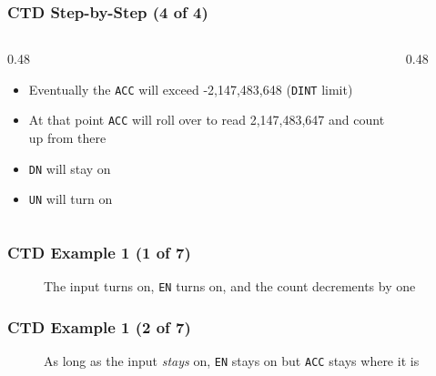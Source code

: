 \begin{frame}
    \frametitle{CTD Step-by-Step (4 of 4)}

    \begin{columns}
        \begin{column}{0.48\linewidth}
            \begin{itemize}
                \item Eventually the \texttt{ACC} will exceed -2,147,483,648 (\texttt{DINT} limit)
                \item At that point \texttt{ACC} will roll over to read 2,147,483,647 and count up from there
                \item \texttt{DN} will stay on
                \item \texttt{UN} will turn on
            \end{itemize}
        \end{column}
        \begin{column}{0.48\linewidth}
            \begin{figure}
                \centering
                \resizebox{\columnwidth}{!}{
                    
                }
            \end{figure}
        \end{column}
    \end{columns}
\end{frame}

\begin{frame}
    \frametitle{CTD Example 1 (1 of 7)}

    \begin{figure}
        \centering
        \resizebox{0.875\linewidth}{!}{
            
        }

        \vspace{0.5em}
        {\footnotesize The input turns on, \texttt{EN} turns on, and the count decrements by one\par}
    \end{figure}
\end{frame}

\begin{frame}
    \frametitle{CTD Example 1 (2 of 7)}

    \begin{figure}
        \centering
        \resizebox{0.875\linewidth}{!}{
            
        }

        \vspace{0.5em}
        {\footnotesize As long as the input \emph{stays} on, \texttt{EN} stays on but \texttt{ACC} stays where it is\par}
    \end{figure}
\end{frame}

